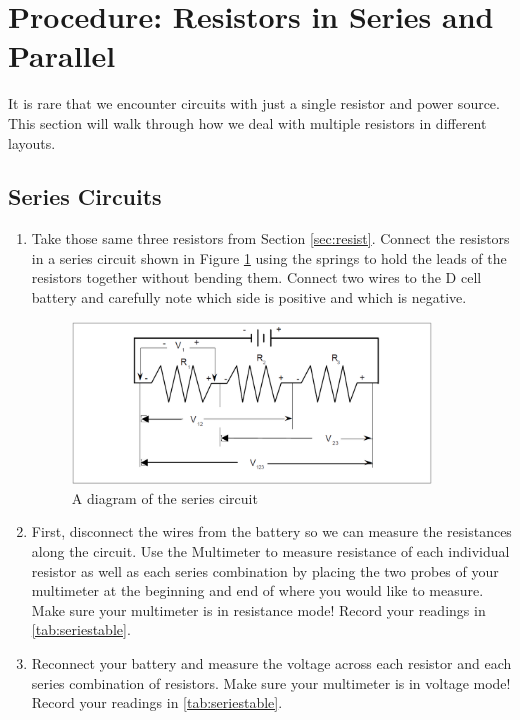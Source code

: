 \section{Procedure: Resistors in Series and Parallel}
It is rare that we encounter circuits with just a single resistor and power source. This section will walk through how we deal with multiple resistors in different layouts.\myskip

\subsection{Series Circuits}
\begin{enumerate}

	\item Take those same three resistors from Section \ref{sec:resist}. Connect the resistors in a series circuit shown in Figure \ref{fig:voltseries} using the springs to hold the leads of the resistors together without bending them. Connect two wires to the D cell battery and carefully note which side is positive and which is negative.

	\begin{figure}[h]
	\centering
	\includegraphics[width=0.9\textwidth]{./Exp2/pic/voltseries.png}
	\caption{A diagram of the series circuit}
	\label{fig:voltseries}
	\end{figure}

	\item First, disconnect the wires from the battery so we can measure the resistances along the circuit. Use the Multimeter to measure resistance of each individual resistor as well as each series combination by placing the two probes of your multimeter at the beginning and end of where you would like to measure. Make sure your multimeter is in resistance mode! Record your readings in \ref{tab:seriestable}.

	\item Reconnect your battery and measure the voltage across each resistor and each series combination of resistors. Make sure your multimeter is in voltage mode! Record your readings in \ref{tab:seriestable}.


\end{enumerate}
